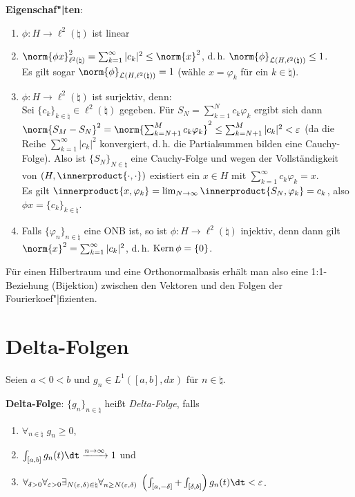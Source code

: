 \textbf{Eigenschaf"|ten}:
\begin{enumerate}
    \item
    $\phi\colon H \rightarrow \ell^2(\natural)$ ist linear

    \item
    $\norm{\phi x}_{\ell^2(\natural)}^2 =
    \sum_{k=1}^\infty |c_k|^2 \le \norm{x}^2$,
    d.\,h. $\norm{\phi}_{\L(H, \ell^2(\natural))} \le 1$.\\
    Es gilt sogar $\norm{\phi}_{\L(H, \ell^2(\natural))} = 1$
    (wähle $x = \varphi_k$ für ein $k \in \natural$).

    \item
    $\phi\colon H \rightarrow \ell^2(\natural)$ ist surjektiv, denn:\\
    Sei $\{c_k\}_{k \in \natural} \in \ell^2(\natural)$ gegeben.
    Für $S_N = \sum_{k=1}^N c_k \varphi_k$ ergibt sich dann\\
    $\norm{S_M - S_N}^2 = \norm{\sum_{k=N+1}^M c_k \varphi_k}^2 \le
    \sum_{k=N+1}^M |c_k|^2 < \varepsilon$
    (da die Reihe $\sum_{k=1}^\infty |c_k|^2$ konvergiert, d.\,h. die
    Partialsummen bilden eine Cauchy-Folge).
    Also ist $\{S_N\}_{N \in \natural}$ eine Cauchy-Folge und wegen der
    Vollständigkeit von $(H, \innerproduct{\cdot, \cdot})$ existiert ein $x \in H$ mit
    $\sum_{k=1}^\infty c_k \varphi_k = x$.\\
    Es gilt $\innerproduct{x, \varphi_k} =
    \lim_{N \to \infty} \innerproduct{S_N, \varphi_k} = c_k$, also
    $\phi x = \{c_k\}_{k \in \natural}$.

    \item
    Falls $\{\varphi_n\}_{n \in \natural}$ eine ONB ist, so ist
    $\phi\colon H \rightarrow \ell^2(\natural)$ injektiv, denn dann gilt\\
    $\norm{x}^2 = \sum_{k=1}^\infty |c_k|^2$, d.\,h.
    $\operatorname{Kern} \phi = \{0\}$.
\end{enumerate}

Für einen Hilbertraum und eine Orthonormalbasis erhält man also eine
1:1-Beziehung (Bijektion) zwischen den Vektoren und den Folgen der
Fourierkoef"|fizienten.

\section{%
    Delta-Folgen%
}

Seien $a < 0 < b$ und $g_n \in L^1([a, b], dx)$ für $n \in \natural$.

\textbf{Delta-Folge}:
$\{g_n\}_{n \in \natural}$ heißt \emph{Delta-Folge}, falls
\begin{enumerate}
    \item
    $\forall_{n \in \natural}\; g_n \ge 0$,

    \item
    $\int_{[a, b]} g_n(t)\dt \xrightarrow{n \to \infty} 1$ und

    \item
    $\forall_{\delta > 0} \forall_{\varepsilon > 0}
    \exists_{N(\varepsilon, \delta) \in \natural}
    \forall_{n \ge N(\varepsilon, \delta)}\;
    \left(\int_{[a, -\delta]} + \int_{[\delta, b]}\right)
    g_n(t) \dt < \varepsilon$.
\end{enumerate}

